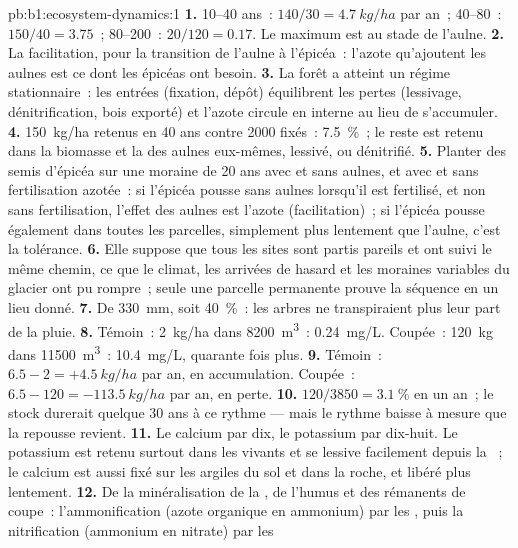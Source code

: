 \begin{solution}{pb:b1:ecosystem-dynamics:1}
\textbf{1.} 10--40 ans~: $140/30 = \qty{4.7}{kg/ha}$ par an~; 40--80~:
$150/40 = \num{3.75}$~; 80--200~: $20/120 = \num{0.17}$. Le maximum est
au stade de l'aulne.
\textbf{2.} La facilitation, pour la transition de l'aulne à l'épicéa~:
l'azote qu'ajoutent les aulnes est ce dont les épicéas ont besoin.
\textbf{3.} La forêt a atteint un régime stationnaire~: les entrées
(fixation, dépôt) équilibrent les pertes (lessivage, dénitrification,
bois exporté) et l'azote circule en interne au lieu de s'accumuler.
\textbf{4.} \qty{150}{kg/ha} retenus en 40 ans contre \num{2000} fixés~:
\qty{7.5}{\%}~; le reste est retenu dans la biomasse et la  des
aulnes eux-mêmes, lessivé, ou dénitrifié.
\textbf{5.} Planter des semis d'épicéa sur une moraine de 20 ans avec
et sans aulnes, et avec et sans fertilisation azotée~: si l'épicéa
pousse sans aulnes lorsqu'il est fertilisé, et non sans fertilisation,
l'effet des aulnes est l'azote (facilitation)~; si l'épicéa pousse
également dans toutes les parcelles, simplement plus lentement que
l'aulne, c'est la tolérance.
\textbf{6.} Elle suppose que tous les sites sont partis pareils et ont
suivi le même chemin, ce que le climat, les arrivées de hasard et les
moraines variables du glacier ont pu rompre~; seule une parcelle
permanente prouve la séquence en un lieu donné.
\textbf{7.} De \qty{330}{mm}, soit \qty{40}{\%}~: les arbres ne
transpiraient plus leur part de la pluie.
\textbf{8.} Témoin~: \qty{2}{kg/ha} dans \qty{8200}{m^3}~:
\qty{0.24}{mg/L}. Coupée~: \qty{120}{kg} dans \qty{11500}{m^3}~:
\qty{10.4}{mg/L}, quarante fois plus.
\textbf{9.} Témoin~: $6.5 - 2 = +\qty{4.5}{kg/ha}$ par an, en
accumulation. Coupée~: $6.5 - 120 = -\qty{113.5}{kg/ha}$ par an, en
perte.
\textbf{10.} $120/3850 = \qty{3.1}{\%}$ en un an~; le stock durerait
quelque \num{30} ans à ce rythme --- mais le rythme baisse à mesure que
la repousse revient.
\textbf{11.} Le calcium par dix, le potassium par dix-huit. Le
potassium est retenu surtout dans les  vivants et se lessive
facilement depuis la ~; le calcium est aussi fixé sur les argiles
du sol et dans la roche, et libéré plus lentement.
\textbf{12.} De la minéralisation de la , de l'humus et des
rémanents de coupe~: l'ammonification (azote organique en ammonium) par
les , puis la nitrification (ammonium en nitrate) par les

\end{solution}
